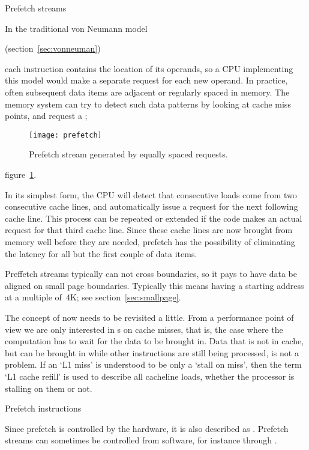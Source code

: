  {Prefetch streams}
\label{sec:prefetch}

In the traditional von Neumann model
\begin{nopackt}
  (section~\ref{sec:vonneuman})
\end{nopackt}
each instruction contains the location of its operands, so a \ac{CPU}
implementing this model would make a separate request for each new
operand. In practice, often subsequent data items are adjacent or
regularly spaced in memory. The memory system can try to detect such
data patterns by looking at cache miss points,
and request a ;
\begin{figure}[ht]
  \texttt{[image: prefetch]}
  \caption{Prefetch stream generated by equally spaced requests.}
  \label{fig:prefetch}
\end{figure}
figure~\ref{fig:prefetch}.

In its simplest form, the \ac{CPU} will detect that consecutive loads come
from two consecutive cache lines, and automatically issue a request
for the next following cache line. This process can be repeated or
extended if the code makes an actual request for that third cache
line. Since these cache lines are now brought from memory well before
they are needed, prefetch has the possibility of eliminating the
latency for all but the first couple of data items.

Preffetch streams typically can not cross
 boundaries, so it pays to
have data be aligned on small page boundaries.
Typically this means having a starting address at a multiple of~4K;
see section~\ref{sec:smallpage}.


The concept of  now needs to be revisited a
little. From a performance point of view we are only interested in
s on cache misses, that is, the case where the
computation has to wait for the data to be brought in. Data that is
not in cache, but can be brought in while other instructions are still
being processed, is not a problem. If an `L1 miss' is understood to be
only a `stall on miss', then the term `L1 cache refill' is used to
describe all cacheline loads, whether the processor is stalling on
them or not.

 {Prefetch instructions}

Since prefetch is controlled by the hardware, it is also described as
.
Prefetch streams can sometimes be
controlled from software, for instance through .

